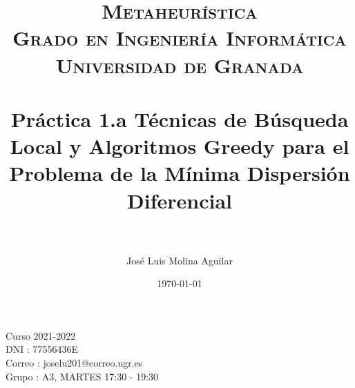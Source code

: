 

\everymath{\displaystyle}

\title{	
\normalfont \normalsize 
\textsc{\textbf{Metaheurística} \\ Grado en Ingeniería Informática \\ Universidad de Granada} \\ [25pt] %
\horrule{0.5pt} \\[0.4cm] %
\huge Práctica 1.a Técnicas de Búsqueda Local y Algoritmos Greedy para el Problema de la Mínima Dispersión Diferencial \\ %
\horrule{2pt} \\[0.5cm] %
}

\author{José Luis Molina Aguilar} %

\date{\normalsize\today} %






\maketitle %
  \centering
  \vfill
  \begin{large}
  Curso 2021-2022\\
  DNI : 77556436E\\
  Correo : joselu201@correo.ugr.es\\
  Grupo : A3, MARTES 17:30 - 19:30
  \vfill
  \end{large}
\newpage %

\tableofcontents %

\listoffigures

\listoftables

\newpage




